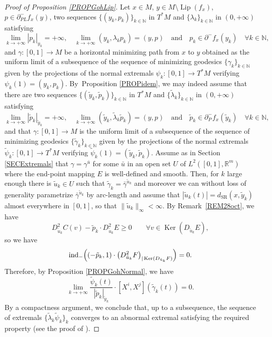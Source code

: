 \documentclass[JEP,XML,SOM,Unicode,NoFloatCountersInSection,published]{cedram}
\newcommand{\SR}{{\scriptscriptstyle\mathrm{SR}}}
\DeclareMathOperator{\Ker}{Ker}
\DeclareMathOperator{\Lip}{Lip}
\newcommand\R{\mathbb R}
\newcommand\N{\mathbb N}
\theoremstyle{definition}
\begin{document}
\begin{proof}[Proof of Proposition \ref{PROPGohLip}]
Let $x\in M$, $y\in M \setminus \Lip(f_x) $, $p \in \partial^-_{PL}f_x(y)$, two sequences $\{(y_k,p_k)\}_{k\in \N}$ in $T^*M$ and $\{\lambda_k\}_{k\in \N}$ in $(0,+\infty)$ satisfying
\[
\lim_{k\to +\infty} \left|p_k\right|_{y_k} = +\infty, \quad \lim_{k\to +\infty} \left(y_k,\lambda_k p_k\right) = (y,p)
\quad \text{and} \quad p_k \in \partial^-f_x(y_k) \quad \forall k \in \N,
\]
and $\gamma :[0,1] \to M$ be a horizontal minimizing path from $x$ to $y$ obtained as the uniform limit of a subsequence of the sequence of minimizing geodesics $\{\gamma_k\}_{k\in \N}$ given by the projections of the normal extremals $\psi_k:[0,1] \to T^*M$ verifying $\psi_k(1)=(y_k,p_k)$. By~Proposition \ref{PROPidem}, we may indeed assume that there are two sequences $\{(\tilde{y}_k,\tilde{p}_k)\}_{k\in \N}$ in $T^*M$ and $\{\tilde{\lambda}_k\}_{k\in \N}$ in $(0,+\infty)$ satisfying
\[
\lim_{k\to +\infty} \left| \tilde{p}_k\right|_{\tilde{y}_k} = +\infty, \quad \lim_{k\to +\infty} \left(\tilde{y}_k,\tilde{\lambda}_k \tilde{p}_k\right) = (y,p)
\quad \text{and} \quad \tilde{p}_k \in \partial^-_Pf_x(\tilde{y}_k) \quad \forall k \in \N,
\]
and that $\gamma :[0,1] \to M$ is the uniform limit of a subsequence of the sequence of minimizing geodesics $\{\tilde{\gamma}_k\}_{k\in \N}$ given by the projections of the normal extremals \hbox{$\tilde{\psi}_k:[0,1] \to T^*M$} verifying $\tilde{\psi}_k(1)=(\tilde{y}_k,\tilde{p}_k)$.
Assume as in Section \ref{SECExtremals} that $\gamma=\gamma ^{\bar{u}}$ for some $\bar{u}$ in an open set $U$ of $L^2([0,1],\R^m)$ where the end-point mapping $E$ is well-defined and smooth. Then, for $k$ large enough there is $\tilde{u}_k \in U$ such that $\tilde{\gamma}_k=\bar{\gamma}^{\tilde{u}_k}$ and moreover we can without loss of generality parametrize $\bar{\gamma}^{\tilde{u}_k}$ by arc-length and assume that $|\tilde{u}_k(t)|=d_{\SR}(x,\tilde{y}_k)$ almost everywhere in $[0,1]$, so that $\|\tilde{u}_k\|_{\infty}<\infty$. By Remark~\ref{REM28oct}, we have
\[
D^2_{\tilde{u}_k}C (v) - \tilde{p}_k \cdot D^2_{\tilde{u}_k}E\geq 0 \qquad \forall v \in \Ker (D_{\tilde{u}_k} E),
\]
so we have
\[
\mathrm{ind}_- \Bigl(\left(-\tilde{p}_k,1\right) \cdot \left(D^2_{\tilde{u}_k} F \right)_{\vert \Ker (D_{\tilde{u}_k} F)} \Bigr) =0.
\]
Therefore, by Proposition \ref{PROPGohNormal}, we have
\[
\lim_{k \to +\infty} \frac{ \tilde{\psi}_k(t) }{ |\tilde{p}_k|_{\tilde{y}_k} } \cdot \left[ X^i,X^j\right] \left(\tilde{\gamma}_k(t)\right) = 0.
\]
By a compactness argument, we conclude that, up to a subsequence, the sequence of extremals $\{\tilde{\lambda}_k\tilde{\psi}_k \}_k$ converges to an abnormal extremal satisfying the required property (see \eg the proof of \cite[Lem.\,4.8]{trelat00}).
\end{proof}
\end{document}
